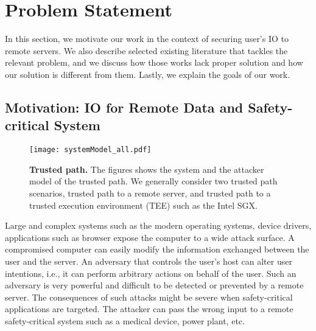 \section{Problem Statement}
\label{sec:problemStatement}

In this section, we motivate our work in the context of securing user's IO to remote servers. We also describe selected existing literature that tackles the relevant problem, and we discuss how those works lack proper solution and how our solution is different from them. Lastly, we explain the goals of our work.

\subsection{Motivation: IO for Remote Data and Safety-critical System}

\begin{figure}[t]
\centering
\texttt{[image: systemModel\_all.pdf]}
\caption{\textbf{Trusted path.} The figures shows the system and the attacker model of the trusted path. We generally consider two trusted path scenarios, \one trusted path to a remote server, and \two trusted path to a trusted execution environment (TEE) such as the Intel SGX.}
\label{fig:trustedPath}
\centering
\end{figure}

Large and complex systems such as the modern operating systems, device drivers, applications such as browser expose the computer to a wide attack surface.
A compromised computer can easily modify the information exchanged between the user and the server. An adversary that controls the user's host can alter user intentions, i.e., it can perform arbitrary actions on behalf of the user. Such an adversary is very powerful and difficult to be detected or prevented by a remote server. The consequences of such attacks might be severe when safety-critical applications are targeted. The attacker can pass the wrong input to a remote safety-critical system such as a medical device, power plant, etc. 

